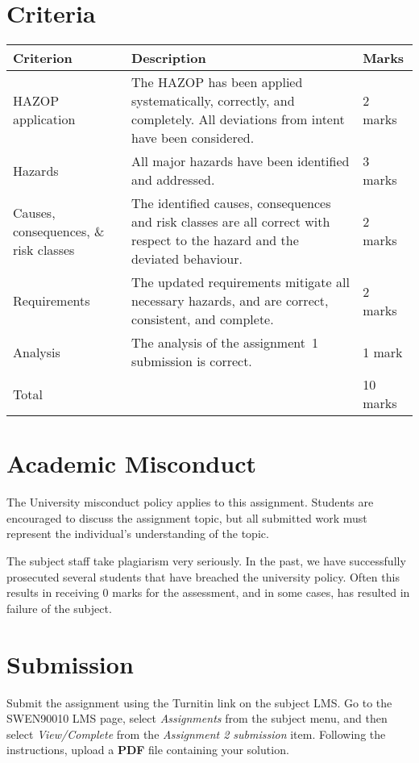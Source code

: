 \documentclass[11pt]{article}
\begin{document}
\section{Criteria}

\begin{center}
\begin{tabular}{p{3cm}p{10cm}l}
\toprule
 {\bf Criterion} & {\bf Description} & {\bf Marks}\\
\midrule
  HAZOP application & The HAZOP has been applied systematically, correctly, and completely. All deviations from intent have been considered. & 2 marks\\[7mm]
  Hazards & All major hazards have been identified and addressed. & 3 marks\\[2mm]
  Causes, consequences, \& risk classes       & The identified causes, consequences and risk classes are all correct with respect to the hazard and the deviated behaviour. & 2 marks\\[12mm]
  Requirements & The updated requirements mitigate all necessary hazards, and are correct, consistent, and complete.  & 2 marks \\[7mm]
  Analysis & The analysis of the assignment~1 submission is correct. & 1 mark\\
\midrule
  Total && 10 marks\\
\bottomrule
\end{tabular}
\end{center}

\section{Academic Misconduct}

The University misconduct policy applies to this assignment. Students are encouraged to discuss the assignment topic, but all submitted work must represent the individual's understanding of the topic. 

The subject staff take plagiarism very seriously. In the past, we have successfully prosecuted several students that have breached the university policy. Often this results in receiving 0 marks for the assessment, and in some cases, has resulted in failure of the subject.

\section{Submission}

Submit the assignment using the Turnitin link on the subject LMS. Go to the SWEN90010 LMS page, select {\em Assignments} from the subject menu, and then select {\em View/Complete} from the {\em Assignment 2   submission} item. Following the instructions, upload a {\bf PDF} file containing your solution.
\end{document}

